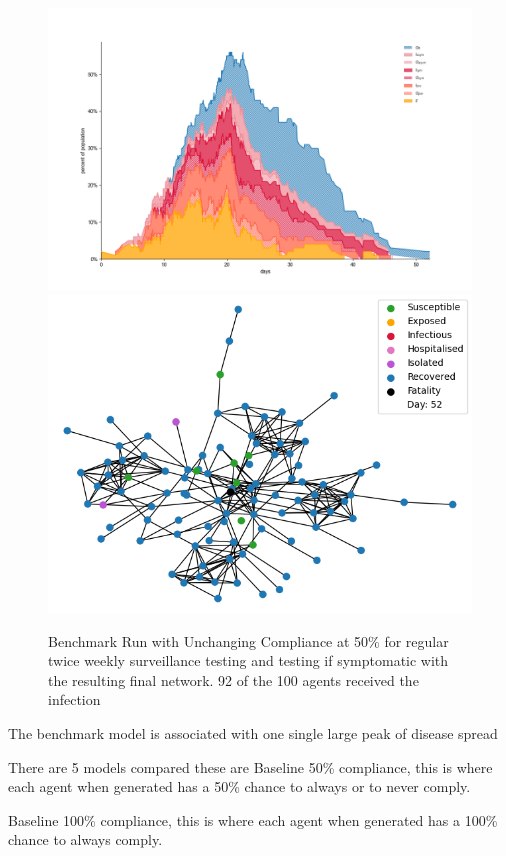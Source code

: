 \documentclass{article}
\begin{document}
\begin{figure}
\centering
\includegraphics[width= 15cm]{Figure3}
\includegraphics[width= 15cm]{Figure3Net}
\caption{Benchmark Run with Unchanging Compliance at 50\% for regular twice weekly surveillance testing and testing if symptomatic with the resulting final network. 92 of the 100 agents received the infection}
\end{figure}


The benchmark model is associated with one single large peak of disease spread

There are 5 models compared these are
Baseline 50\% compliance, this is where each agent when generated has a 50\% chance to always or to never comply. 

Baseline 100\% compliance, this is where each agent when generated has a 100\% chance to always comply. 
\end{document}
